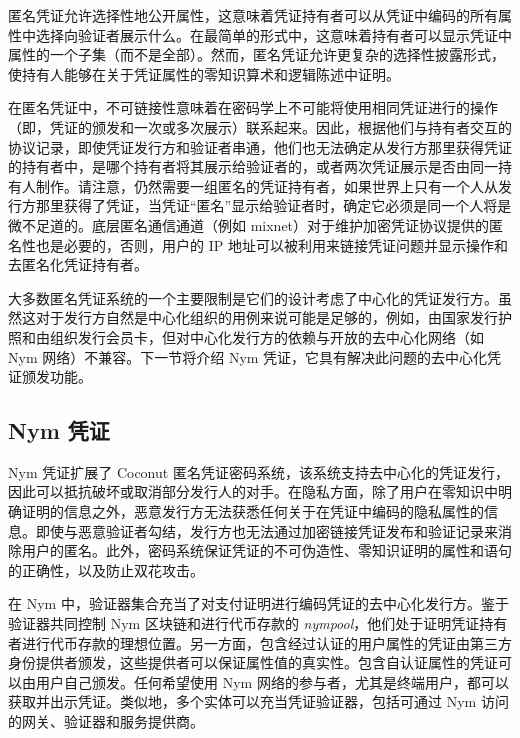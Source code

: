 \documentclass{article}
\begin{document}
	匿名凭证允许选择性地公开属性，这意味着凭证持有者可以从凭证中编码的所有属性中选择向验证者展示什么。在最简单的形式中，这意味着持有者可以显示凭证中属性的一个子集（而不是全部）。然而，匿名凭证允许更复杂的选择性披露形式，使持有人能够在关于凭证属性的零知识算术和逻辑陈述中证明。\newline

	在匿名凭证中，不可链接性意味着在密码学上不可能将使用相同凭证进行的操作（即，凭证的颁发和一次或多次展示）联系起来。因此，根据他们与持有者交互的协议记录，即使凭证发行方和验证者串通，他们也无法确定从发行方那里获得凭证的持有者中，是哪个持有者将其展示给验证者的，或者两次凭证展示是否由同一持有人制作。请注意，仍然需要一组匿名的凭证持有者，如果世界上只有一个人从发行方那里获得了凭证，当凭证“匿名”显示给验证者时，确定它必须是同一个人将是微不足道的。底层匿名通信通道（例如 mixnet）对于维护加密凭证协议提供的匿名性也是必要的，否则，用户的 IP 地址可以被利用来链接凭证问题并显示操作和去匿名化凭证持有者。\newline

	大多数匿名凭证系统的一个主要限制是它们的设计考虑了中心化的凭证发行方。虽然这对于发行方自然是中心化组织的用例来说可能是足够的，例如，由国家发行护照和由组织发行会员卡，但对中心化发行方的依赖与开放的去中心化网络（如 Nym 网络）不兼容。下一节将介绍 Nym 凭证，它具有解决此问题的去中心化凭证颁发功能。\newline

	\subsection{Nym 凭证}

	Nym 凭证扩展了 Coconut \cite{ref101} 匿名凭证密码系统，该系统支持去中心化的凭证发行，因此可以抵抗破坏或取消部分发行人的对手。在隐私方面，除了用户在零知识中明确证明的信息之外，恶意发行方无法获悉任何关于在凭证中编码的隐私属性的信息。即使与恶意验证者勾结，发行方也无法通过加密链接凭证发布和验证记录来消除用户的匿名。此外，密码系统保证凭证的不可伪造性、零知识证明的属性和语句的正确性，以及防止双花攻击。\newline

	在 Nym 中，验证器集合充当了对支付证明进行编码凭证的去中心化发行方。鉴于验证器共同控制 Nym 区块链和进行代币存款的 \emph{nympool}，他们处于证明凭证持有者进行代币存款的理想位置。另一方面，包含经过认证的用户属性的凭证由第三方身份提供者颁发，这些提供者可以保证属性值的真实性。包含自认证属性的凭证可以由用户自己颁发。任何希望使用 Nym 网络的参与者，尤其是终端用户，都可以获取并出示凭证。类似地，多个实体可以充当凭证验证器，包括可通过 Nym 访问的网关、验证器和服务提供商。\newline
\end{document}
